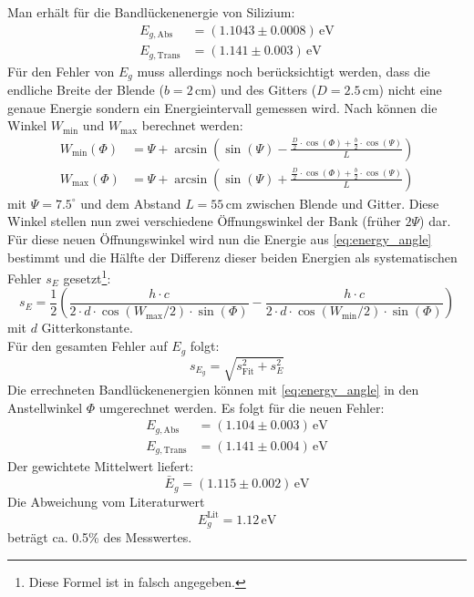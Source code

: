 Man erhält für die Bandlückenenergie von Silizium:
\begin{equation}
\begin{split}
  E_{g, \text{Abs}} &= (1.1043 \pm 0.0008)\,\text{eV} \\
  E_{g, \text{Trans}} &= (1.141 \pm 0.003)\,\text{eV}
\end{split}
\end{equation}
Für den Fehler von $E_g$ muss allerdings noch berücksichtigt werden, dass die endliche Breite der Blende ($b=2$\,cm) und 
des Gitters ($D=2.5$\,cm) nicht eine genaue Energie sondern ein Energieintervall gemessen wird. Nach \cite{staatsex} können 
die Winkel $W_\text{min}$ und $W_\text{max}$ berechnet werden: 
\begin{equation}
\begin{split}
  W_\text{min}(\Phi) &= \Psi + \arcsin \left( \sin(\Psi) - \frac{\frac{D}{2} \cdot \cos(\Phi) + \frac{b}{2} \cdot \cos(\Psi)}{L} \right) \\
  W_\text{max}(\Phi) &= \Psi + \arcsin \left( \sin(\Psi) + \frac{\frac{D}{2} \cdot \cos(\Phi) + \frac{b}{2} \cdot \cos(\Psi)}{L} \right) 
\end{split}
\end{equation}
mit $\Psi=7.5^\circ$ und dem Abstand $L=55$\,cm zwischen Blende und Gitter. Diese Winkel stellen nun zwei verschiedene Öffnungswinkel der Bank 
(früher $2\Psi$) dar. Für diese neuen Öffnungswinkel wird nun die Energie aus \autoref{eq:energy_angle} bestimmt und die Hälfte der Differenz 
dieser beiden Energien als systematischen Fehler $s_E$ gesetzt\footnote{Diese Formel ist in \cite{staatsex} falsch angegeben.}:
\begin{equation}
  s_E = \frac{1}{2} \left( \frac{h \cdot c}{2 \cdot d \cdot \cos(W_\text{max} / 2) \cdot \sin (\Phi)} - \frac{h \cdot c}{2 \cdot d \cdot \cos(W_\text{min} / 2) \cdot \sin (\Phi)} \right) 
\end{equation}
mit $d$ Gitterkonstante.\\
Für den gesamten Fehler auf $E_g$ folgt:
\begin{equation}
  s_{E_g} = \sqrt{s_\text{Fit}^2 + s_E^2}
\end{equation}
Die errechneten Bandlückenenergien können mit \autoref{eq:energy_angle} in den Anstellwinkel $\Phi$ umgerechnet werden. Es folgt für die 
neuen Fehler:
\begin{equation}
\begin{split}
  E_{g, \text{Abs}} &= (1.104 \pm 0.003)\,\text{eV} \\
  E_{g, \text{Trans}} &= (1.141 \pm 0.004)\,\text{eV}
\end{split}
\end{equation}
Der gewichtete Mittelwert liefert:
\begin{equation}
  \bar{E}_g = (1.115 \pm 0.002)\,\text{eV}
\end{equation}
Die Abweichung vom Literaturwert
\begin{equation}
  E_g^{\text{Lit}} = 1.12\,\text{eV}
\end{equation}
beträgt ca. 0.5\% des Messwertes.


